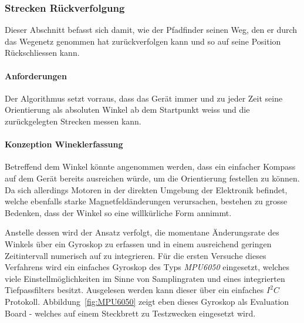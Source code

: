 \documentclass[main.tex]{subfiles} %
\begin{document}

\subsubsection{Strecken Rückverfolgung}

Dieser Abschnitt befasst sich damit, wie der Pfadfinder seinen Weg, den er
durch das Wegenetz genommen hat zurückverfolgen kann und so auf seine Position
Rückschliessen kann.

\paragraph{Anforderungen}
Der Algorithmus setzt vorraus, dass das Gerät immer und zu jeder Zeit seine
Orientierung als absoluten Winkel ab dem Startpunkt weiss und die
zurückgelegten Strecken messen kann.

\paragraph{Konzeption Wineklerfassung}
Betreffend dem Winkel könnte angenommen werden, dass ein einfacher Kompass auf
dem Gerät bereits ausreichen würde, um die Orientierung festellen zu können. Da
sich allerdings Motoren in der direkten Umgebung der Elektronik befindet,
welche ebenfalls starke Magnetfeldänderungen verursachen, bestehen zu grosse
Bedenken, dass der Winkel so eine willkürliche Form annimmt.

Anstelle dessen wird der Ansatz verfolgt, die momentane Änderungsrate des
Winkels über ein Gyroskop zu erfassen und in einem ausreichend geringen
Zeitintervall numerisch auf zu integrieren. Für die ersten Versuche dieses
Verfahrens wird ein einfaches Gyroskop des Typs \textit{MPU6050} eingesetzt,
welches viele Einstellmöglichkeiten im Sinne von Samplingraten und eines
integrierten Tiefpassfilters besitzt. Ausgelesen werden kann dieser über ein
einfaches $I^2C$ Protokoll. Abbildung~\ref{fig:MPU6050} zeigt eben dieses
Gyroskop als Evaluation Board - welches auf einem Steckbrett zu Testzwecken
eingesetzt wird.
\end{document}

